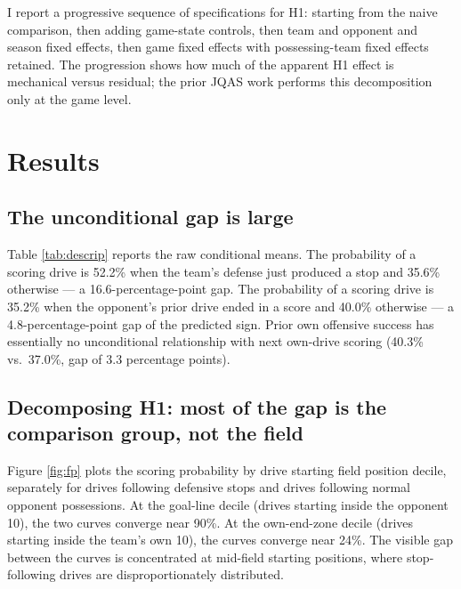 \documentclass[11pt]{article}
\begin{document}
I report a progressive sequence of specifications for H1: starting from the
naive comparison, then adding game-state controls, then team and opponent
and season fixed effects, then game fixed effects with possessing-team fixed
effects retained. The progression shows how much of the apparent H1 effect
is mechanical versus residual; the prior JQAS work performs this
decomposition only at the game level.

\section{Results}\label{sec:results}

\subsection{The unconditional gap is large}

Table \ref{tab:descrip} reports the raw conditional means. The probability
of a scoring drive is 52.2\% when the team's defense just produced a stop
and 35.6\% otherwise --- a 16.6-percentage-point gap. The probability of a
scoring drive is 35.2\% when the opponent's prior drive ended in a score and
40.0\% otherwise --- a 4.8-percentage-point gap of the predicted sign.
Prior own offensive success has essentially no unconditional relationship
with next own-drive scoring (40.3\% vs.\ 37.0\%, gap of 3.3 percentage points).



\subsection{Decomposing H1: most of the gap is the comparison group, not the field}

Figure \ref{fig:fp} plots the scoring probability by drive starting field
position decile, separately for drives following defensive stops and drives
following normal opponent possessions. At the goal-line decile (drives
starting inside the opponent 10), the two curves converge near 90\%. At the
own-end-zone decile (drives starting inside the team's own 10), the curves
converge near 24\%. The visible gap between the curves is concentrated at
mid-field starting positions, where stop-following drives are
disproportionately distributed.
\end{document}
